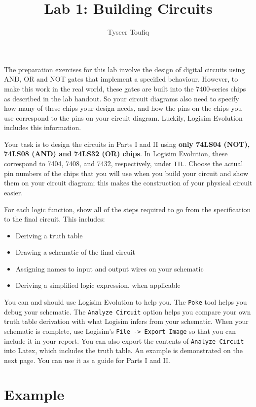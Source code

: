 \documentclass{article}
\title{Lab 1: Building Circuits}
\author{Tyseer Toufiq}
\begin{document}
\maketitle

The preparation exercises for this lab involve the design of digital circuits using AND, OR and NOT gates that implement a specified behaviour.
However, to make this work in the real world, these gates are built into the 7400-series chips as described in the lab handout.
So your circuit diagrams also need to specify how many of these chips your design needs, and how the pins on the chips you use correspond to the pins on your circuit diagram.
Luckily, Logisim Evolution includes this information.

Your task is to design the circuits in Parts I and II using \textbf{only 74LS04 (NOT), 74LS08 (AND) and 74LS32 (OR) chips}.
In Logisim Evolution, these correspond to 7404, 7408, and 7432, respectively, under \verb|TTL|.
Choose the actual pin numbers of the chips that you will use when you build your circuit and show them on your circuit diagram;
this makes the construction of your physical circuit easier.

For each logic function, show all of the steps required to go from the specification to the final circuit.
This includes:

\begin{itemize}
\item Deriving a truth table
\item Drawing a schematic of the final circuit
\item Assigning names to input and output wires on your schematic
\item Deriving a simplified logic expression, when applicable
\end{itemize}

You can and should use Logisim Evolution to help you.
The \verb|Poke| tool helps you debug your schematic.
The \verb|Analyze Circuit| option helps you compare your own truth table derivation with what Logisim infers from your schematic.
When your schematic is complete, use Logisim's \verb|File -> Export Image| so that you can include it in your report.
You can also export the contents of \verb|Analyze Circuit| into Latex, which includes the truth table.
An example is demonstrated on the next page.
You can use it as a guide for Parts I and II.

\newpage
\section*{Example}
\end{document}
